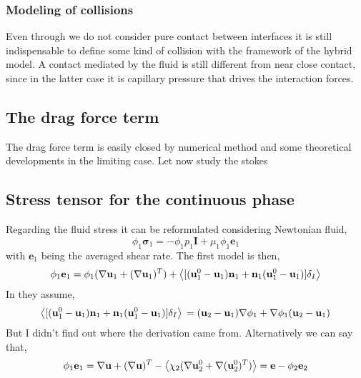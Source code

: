 \subsubsection{Modeling of collisions}

Even through we do not consider pure contact between interfaces it is still indispensable to define some kind of collision with the framework of the hybrid model. 
A contact mediated by the fluid is still different from near close contact, since in the latter case it is capillary pressure that drives the interaction forces. 

\subsection*{The drag force term}

The drag force term is easily closed by numerical method and some theoretical developments in the limiting case. 
Let now study the stokes 

\subsection*{Stress tensor for the continuous phase }
Regarding the fluid stress it can be reformulated considering Newtonian fluid,
\begin{equation}
    \phi_1 \bm{\sigma}_1 
    = - \phi_1 p_1 \textbf{I}
    + \mu_1 \phi_1 \textbf{e}_1
\end{equation}
with $\textbf{e}_1$ being the averaged shear rate. 
The first model is then, 
\begin{align*}
    \phi_1 \textbf{e}_1
    = \phi_1 (\nabla \textbf{u}_1+ (\mathbf{\nabla} \textbf{u}_1)^T)
    + \left<[(\textbf{u}_1^0 - \textbf{u}_1)  \textbf{n}_1 +  \textbf{n}_1(\textbf{u}_1^0 - \textbf{u}_1 )]\delta_I\right>
\end{align*}
In \citet[chap 9]{ishii1975thermo} they assume,
\begin{equation}
    \left<[(\textbf{u}_1^0 - \textbf{u}_1)  \textbf{n}_1 +  \textbf{n}_1(\textbf{u}_1^0 - \textbf{u}_1 )]\delta_I\right>\\
    = 
    (\textbf{u}_2 - \textbf{u}_1)  \mathbf{\nabla} \phi_1 +  \mathbf{\nabla} \phi_1(\textbf{u}_2 - \textbf{u}_1 )\\
\end{equation}
But I didn't find out where the derivation came from. 
Alternatively we can say that, 
\begin{align*}
    \phi_1 \textbf{e}_1
    = \nabla \textbf{u}+ (\mathbf{\nabla} \textbf{u})^T
    - \left<\chi_2 (\mathbf{\nabla}\textbf{u}_2^0 + \mathbf{\nabla}(\textbf{u}_2^0 )^T)\right>
    = \textbf{e}
    - \phi_2 \textbf{e}_2
\end{align*}

